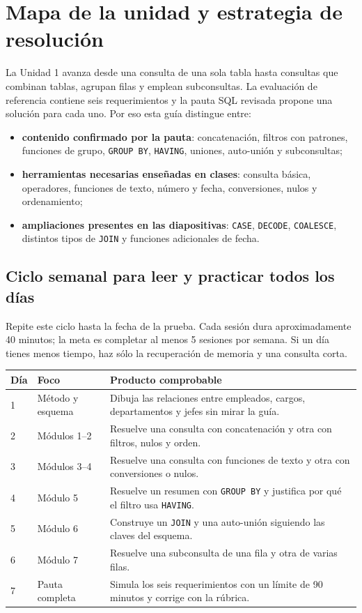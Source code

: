 \documentclass[11pt,a4paper]{article}
\newcommand{\MinutosSesion}{40}
\newcommand{\MetaSemanal}{5}
\newcommand{\campo}[1]{\texttt{#1}}
\begin{document}
\newpage
\tableofcontents
\newpage

\section{Mapa de la unidad y estrategia de resolución}

La Unidad 1 avanza desde una consulta de una sola tabla hasta consultas que combinan tablas,
agrupan filas y emplean subconsultas. La evaluación de referencia contiene seis requerimientos y la
pauta SQL revisada propone una solución para cada uno. Por eso esta guía distingue entre:

\begin{itemize}
  \item \textbf{contenido confirmado por la pauta}: concatenación, filtros con patrones, funciones
  de grupo, \campo{GROUP BY}, \campo{HAVING}, uniones, auto-unión y subconsultas;
  \item \textbf{herramientas necesarias enseñadas en clases}: consulta básica, operadores,
  funciones de texto, número y fecha, conversiones, nulos y ordenamiento;
  \item \textbf{ampliaciones presentes en las diapositivas}: \campo{CASE}, \campo{DECODE},
  \campo{COALESCE}, distintos tipos de \campo{JOIN} y funciones adicionales de fecha.
\end{itemize}

\subsection{Ciclo semanal para leer y practicar todos los días}

Repite este ciclo hasta la fecha de la prueba. Cada sesión dura aproximadamente
\MinutosSesion{} minutos; la meta es completar al menos \MetaSemanal{} sesiones por semana. Si un
día tienes menos tiempo, haz sólo la recuperación de memoria y una consulta corta.

\begin{longtable}{p{} p{} p{}}
\toprule
\textbf{Día} & \textbf{Foco} & \textbf{Producto comprobable} \\
\midrule
\endhead
1 & Método y esquema & Dibuja las relaciones entre empleados, cargos, departamentos y jefes sin
mirar la guía. \\
2 & Módulos 1--2 & Resuelve una consulta con concatenación y otra con filtros, nulos y orden. \\
3 & Módulos 3--4 & Resuelve una consulta con funciones de texto y otra con conversiones o nulos. \\
4 & Módulo 5 & Resuelve un resumen con \campo{GROUP BY} y justifica por qué el filtro usa
\campo{HAVING}. \\
5 & Módulo 6 & Construye un \campo{JOIN} y una auto-unión siguiendo las claves del esquema. \\
6 & Módulo 7 & Resuelve una subconsulta de una fila y otra de varias filas. \\
7 & Pauta completa & Simula los seis requerimientos con un límite de 90 minutos y corrige con la
rúbrica. \\
\bottomrule
\end{longtable}
\end{document}
